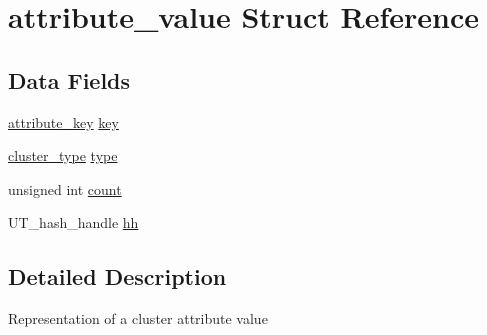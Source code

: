 \hypertarget{structattribute__value}{
\section{attribute\_\-value Struct Reference}
\label{structattribute__value}
}
\subsection*{Data Fields}
\begin{DoxyCompactItemize}
\item 
\hyperlink{structattribute__key}{attribute\_\-key} \hyperlink{structattribute__value_aa8b5ae41c150e4fefb800d3b1924278d}{key}
\item 
\hyperlink{spp__ai_8h_ae2ff3c6586aa2ab211a102abfde86640}{cluster\_\-type} \hyperlink{structattribute__value_a5322c4edde771a7ee0d9fc5f5e45484c}{type}
\item 
unsigned int \hyperlink{structattribute__value_a5579c0304c2e9ab488ac94905b385045}{count}
\item 
UT\_\-hash\_\-handle \hyperlink{structattribute__value_a9abf5d1758ee0cc4803e3b40fc4481cc}{hh}
\end{DoxyCompactItemize}


\subsection{Detailed Description}
Representation of a cluster attribute value 


